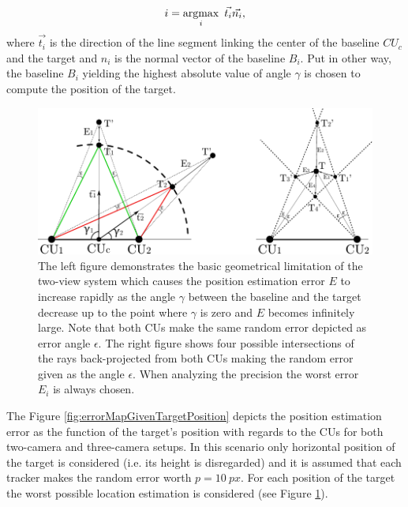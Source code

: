 \begin{align}
i = \argmax_{i}\ \vec{t_{i}}\vec{n_{i}},
\end{align}
where $\vec{t_{i}}$ is the direction of the line segment linking the center of the baseline $CU_{c}$ and the target and $n_{i}$ is the normal vector of the baseline $B_{i}$. Put in other way, the baseline $B_{i}$ yielding the highest absolute value of angle $\gamma$ is chosen to compute the position of the target.

\begin{figure}[htb]\centering
	\centering
	\includegraphics[width=0.75\linewidth]{fig/target_base_geometry.pdf}
	\caption{The left figure demonstrates the basic geometrical limitation of the two-view system which causes the position estimation error $E$ to increase rapidly as the angle $\gamma$ between the baseline and the target decrease up to the point where $\gamma$ is zero and $E$ becomes infinitely large. Note that both CUs make the same random error depicted as error angle $\epsilon$. The right figure shows four possible intersections of the rays back-projected from both CUs making the random error given as the angle $\epsilon$. When analyzing the precision the worst error $E_{i}$ is always chosen.}
	\label{fig:target_base_geometry_and_worst_error}
\end{figure}

The Figure \ref{fig:errorMapGivenTargetPosition} depicts the position estimation error as the function of the target's position with regards to the CUs for both two-camera and three-camera setups. In this scenario only horizontal position of the target is considered (i.e. its height is disregarded) and it is assumed that each tracker makes the random error worth $p = 10~px$. For each position of the target the worst possible location estimation is considered (see Figure \ref{fig:target_base_geometry_and_worst_error}).

